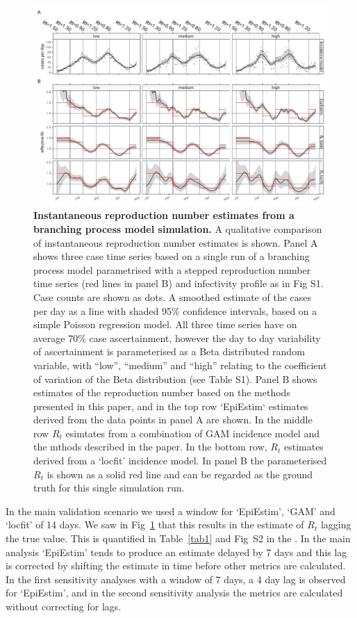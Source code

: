 \documentclass[10pt,letterpaper]{article}
\begin{document}
\begin{figure}[!ht]
\centerline{\includegraphics{fig/fig1-noise-qualitative}}
\caption{{\bf Instantaneous reproduction number estimates from a branching process model simulation.}
A qualitative comparison of instantaneous reproduction number estimates is shown. Panel A shows three case time series based on a single run of a branching process model parametrised with a stepped reproduction number time series (red lines in panel B) and infectivity profile as in  Fig S1. Case counts are shown as dots. A smoothed estimate of the cases per day as a line with shaded 95\% confidence intervals, based on a simple Poisson regression model. All three time series have on average 70\% case ascertainment, however the day to day variability of ascertainment is parameterised as a Beta distributed random variable, with ``low'', ``medium'' and ``high'' relating to the coefficient of variation of the Beta distribution (see  Table S1). Panel B shows estimates of the reproduction number based on the methods presented in this paper, and in the top row `EpiEstim` estimates derived from the data points in panel A are shown. In the middle row $R_t$ esimtates from a combination of GAM incidence model and the mthods described in the paper. In the bottom row, $R_t$ estimates derived from a `locfit' incidence model. In panel B the parameterised $R_t$ is shown as a solid red line and can be regarded as the ground truth for this single simulation run.}
\label{fig1}
\end{figure}

In the main validation scenario we used a window for `EpiEstim', `GAM' and `locfit' of 14 days. We saw in Fig~\ref{fig1} that this results in the estimate of $R_t$ lagging the true value. This is quantified in Table~\ref{tab1} and Fig~S2 in the . In the main analysis `EpiEstim' tends to produce an estimate delayed by 7 days and this lag is corrected by shifting the estimate in time before other metrics are calculated. In the first sensitivity analyses with a window of 7 days, a 4 day lag is observed for `EpiEstim', and in the second sensitivity analysis the metrics are calculated without correcting for lags.
\end{document}
